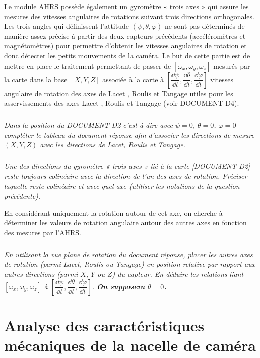 \documentclass[10pt,fleqn]{article} %
\begin{document}
Le module AHRS possède également un gyromètre « trois axes » qui assure les mesures des vitesses angulaires de rotations suivant trois directions orthogonales. 
Les trois angles qui définissent l’attitude $(\psi,\theta,\varphi)$ ne sont pas déterminés de manière assez précise à partir des deux capteurs précédents (accéléromètres et magnétomètres) pour permettre d’obtenir les vitesses angulaires de rotation et donc détecter les petits mouvements de la caméra. 
Le but de cette partie est de mettre en place le traitement permettant de passer de $[\omega_x,\omega_y,\omega_z]$  mesurés par la carte dans la base $[X, Y, Z]$ associée à la carte à $\left[ \dfrac{\dd \psi}{\dd t},\dfrac{\dd \theta}{\dd t},\dfrac{\dd \varphi}{\dd t} \right]$ vitesses angulaire de rotation des axes de Lacet , Roulis et Tangage utiles pour les asservissements des axes Lacet , Roulis et Tangage (voir DOCUMENT D4).


\subparagraph{\label{q16}}\textit{Dans la position du DOCUMENT D2 c’est-à-dire avec $\psi=0$, $\theta=0$, $\varphi=0$ compléter le tableau du document réponse afin d’associer les directions de mesure $(X, Y, Z)$ avec les directions de Lacet, Roulis et Tangage.}

\subparagraph{\label{q17}}\textit{Une des directions du gyromètre « trois axes » lié à la carte [DOCUMENT D2] reste toujours colinéaire avec la direction de l’un des axes de rotation. Préciser laquelle reste colinéaire et avec quel axe (utiliser les notations de la question précédente).}

En considérant uniquement la rotation autour de cet axe, on cherche à déterminer les valeurs de rotation angulaire autour des autres axes en fonction des mesures par l’AHRS. 

\subparagraph{\label{q18}}\textit{En utilisant la vue plane de rotation du document réponse, placer les autres axes de rotation (parmi Lacet, Roulis ou Tangage) en position relative par rapport aux autres directions (parmi $X$, $Y$ ou $Z$) du capteur. En déduire les relations liant $[\omega_x,\omega_y,\omega_z]$ à $\left[ \dfrac{\dd \psi}{\dd t},\dfrac{\dd \theta}{\dd t},\dfrac{\dd \varphi}{\dd t} \right]$. \textbf{On supposera $\theta = 0$.}}




\section{Analyse des caractéristiques mécaniques de la nacelle de caméra}
\end{document}
